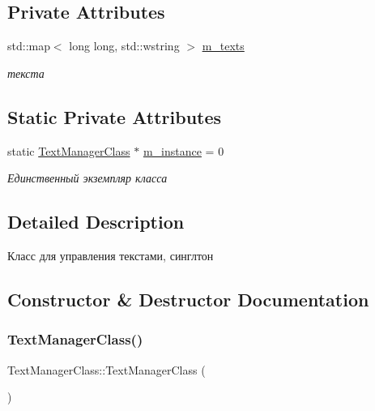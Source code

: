 \subsection*{Private Attributes}
\begin{DoxyCompactItemize}
\item 
std\+::map$<$ long long, std\+::wstring $>$ \hyperlink{class_text_manager_class_a9f9c5d46a765b8a74d40f6983d871f51}{m\+\_\+texts}
\begin{DoxyCompactList}\small\item\em текста \end{DoxyCompactList}\end{DoxyCompactItemize}
\subsection*{Static Private Attributes}
\begin{DoxyCompactItemize}
\item 
static \hyperlink{class_text_manager_class}{Text\+Manager\+Class} $\ast$ \hyperlink{class_text_manager_class_a499d0b48c5f7200edb4e07b58e63f605}{m\+\_\+instance} = 0
\begin{DoxyCompactList}\small\item\em Единственный экземпляр класса \end{DoxyCompactList}\end{DoxyCompactItemize}


\subsection{Detailed Description}
Класс для управления текстами, синглтон 

\subsection{Constructor \& Destructor Documentation}
\mbox{\label{class_text_manager_class_af52c850fea9fac64799692df3279cd6e}} 
\subsubsection{\texorpdfstring{Text\+Manager\+Class()}{TextManagerClass()}\hspace{0.1cm}{\footnotesize\ttfamily [1/2]}}
{\footnotesize\ttfamily Text\+Manager\+Class\+::\+Text\+Manager\+Class (\begin{DoxyParamCaption}{ }\end{DoxyParamCaption})\hspace{0.3cm}{\ttfamily [private]}}

